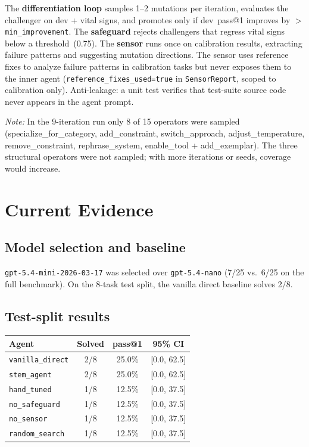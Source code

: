 \documentclass[11pt,a4paper]{article}
\begin{document}
The \textbf{differentiation loop} samples 1--2 mutations per iteration,
evaluates the challenger on dev + vital signs, and promotes only if dev~pass@1
improves by $>$\texttt{min\_improvement}. The \textbf{safeguard} rejects
challengers that regress vital signs below a threshold~(0.75). The
\textbf{sensor} runs once on calibration results, extracting failure patterns
and suggesting mutation directions. The sensor uses reference fixes to analyze
failure patterns in calibration tasks but never exposes them to the inner agent
(\texttt{reference\_fixes\_used=true} in \texttt{SensorReport}, scoped to
calibration only).
Anti-leakage: a unit test verifies that test-suite source code never appears in
the agent prompt.

\textit{Note:} In the 9-iteration run only 8 of 15 operators were sampled
(specialize\_for\_category, add\_constraint, switch\_approach, adjust\_temperature,
remove\_constraint, rephrase\_system, enable\_tool + add\_exemplar). The three
structural operators were not sampled; with more iterations or seeds, coverage
would increase.


\section{Current Evidence}

\subsection*{Model selection and baseline}

\texttt{gpt-5.4-mini-2026-03-17} was selected over \texttt{gpt-5.4-nano}
(7/25 vs.\ 6/25 on the full benchmark). On the 8-task test split, the vanilla
direct baseline solves 2/8.

\subsection*{Test-split results}

\begin{center}\small
\begin{tabular}{lccc}
\toprule
Agent & Solved & pass@1 & 95\% CI \\
\midrule
\texttt{vanilla\_direct} & 2/8 & 25.0\% & [0.0, 62.5] \\
\texttt{stem\_agent} & 2/8 & 25.0\% & [0.0, 62.5] \\
\texttt{hand\_tuned} & 1/8 & 12.5\% & [0.0, 37.5] \\
\texttt{no\_safeguard} & 1/8 & 12.5\% & [0.0, 37.5] \\
\texttt{no\_sensor} & 1/8 & 12.5\% & [0.0, 37.5] \\
\texttt{random\_search} & 1/8 & 12.5\% & [0.0, 37.5] \\
\bottomrule
\end{tabular}
\end{center}
\end{document}
